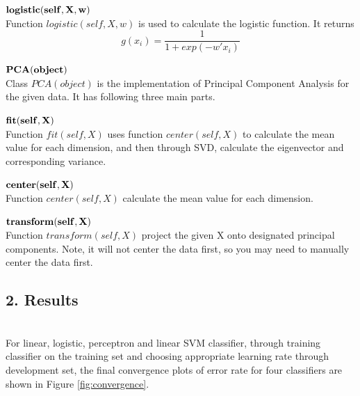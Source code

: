 \begin{description}
\begin{description}
	\item $\bf logistic(self, X, w)$\\
		Function $logistic(self, X, w)$ is used to calculate the logistic function. It returns 
		$$g(x_i) = \frac{1}{1 + exp(- w' x_i)}$$
	
%
	\end{description}

\item[Class: ] $\bf PCA(object)$ \\
	Class $PCA(object)$ is the implementation of Principal Component Analysis for the given data. It has following three main parts.
	\begin{description}
	\item $\bf fit(self, X)$ \\
		Function $fit(self, X)$ uses function $center(self, X)$ to calculate the mean value for each dimension, and then through SVD, calculate the eigenvector and corresponding variance.
	
	\item $\bf center(self, X)$ \\
		Function $center(self, X)$ calculate the mean value for each dimension.
	
	\item $\bf transform(self, X)$ \\
		Function $transform(self, X)$ project the given X onto designated principal components. Note, it will not center the data first, so you may need to manually center the data first.
	
	\end{description}

\end{description}

\newpage
\subsection*{\large 2. Results}
\\

For linear, logistic, perceptron and linear SVM classifier, through training classifier on the training set and choosing appropriate learning rate through development set, the final convergence plots of error rate for four classifiers are shown in Figure \ref{fig:convergence}.

